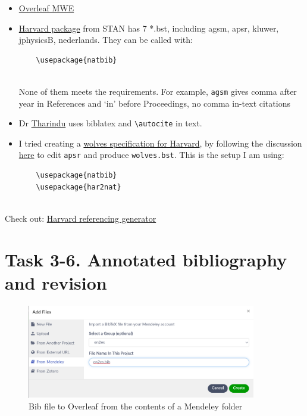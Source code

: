 \documentclass[a4paper,11pt]{article}
\begin{document}
\begin{itemize}
	\item \href{https://www.overleaf.com/project/6227c1c064c39caee9540084}{Overleaf MWE}
	\item \href{https://www.ctan.org/pkg/harvard}{Harvard package} from STAN has 7 *.bst, including agsm, apsr, kluwer, jphysicsB, nederlands. They can be called with:
	
	\begin{lstlisting}
	\usepackage{natbib}
	
	\end{lstlisting}
	
	None of them meets the requirements. For example, \verb|agsm| gives comma after year in References and `in' before Proceedings, no comma in-text citations
	
	\item Dr \href{https://github.com/TharinduDR/Thesis/}{Tharindu} uses biblatex and 
	\verb|\autocite| in text.
	\item I tried creating a \href{https://github.com/kunilovskaya/dskills_workshop/tree/main/w3_bibs_beamer/wolves.bst}{wolves specification for Harvard}, by following the discussion \href{https://tex.stackexchange.com/questions/134258/harvard-style-bibliography-with-biblatex-almost-but-not-quite/134264#134264}{here} to edit \verb|apsr| and produce \verb|wolves.bst|. This is the setup I am using:
	
	\begin{lstlisting}
	\usepackage{natbib}
	\usepackage{har2nat}
	
	\end{lstlisting}
	
\end{itemize}

Check out: \href{https://www.mybib.com/tools/harvard-referencing-generator}{Harvard referencing generator}

\section*{Task 3-6. Annotated bibliography and revision}
\label{task}

\begin{figure}[h!]
	\centering
	\label{fig:integrate}
	\includegraphics[width=10cm]{pics/group_bib.png}
	\caption{Bib file to Overleaf from the contents of a Mendeley folder}
\end{figure}
\end{document}
